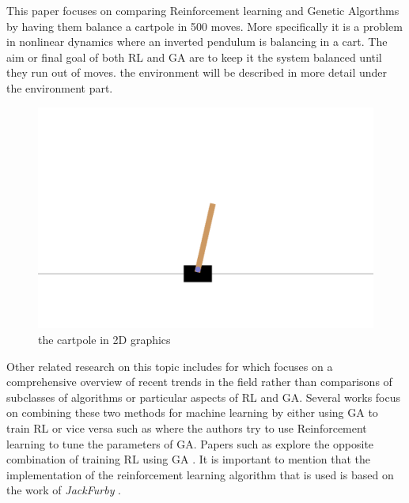 This paper focuses on comparing Reinforcement learning and Genetic Algorthms by having them balance a cartpole in 500 moves. More specifically it is a problem in nonlinear dynamics where an inverted pendulum is balancing in a cart. The aim or final goal of both RL and GA are to keep it the system balanced until they run out of moves. the environment will be described in more detail under the environment part.  
\begin{figure}[H]
    \centering
    \includegraphics [scale = 0.18]{Images/cartpole.png}
    \caption{the cartpole in 2D graphics}
    \label{figPOLE}
\end{figure}
Other related research on this topic includes for \cite{drugan2019reinforcement} which focuses on a comprehensive overview of recent trends in the field rather than comparisons of subclasses of algorithms or particular aspects of RL and GA. Several works focus on combining these two methods for machine learning by either using GA to train RL or vice versa such as \cite{eiben2007reinforcement} where the authors try to use Reinforcement learning to tune the parameters of GA.  Papers such as  \cite{khadka2018evolutionary} explore the opposite combination of training RL using GA . It is important to mention that the implementation of the reinforcement learning algorithm that is used is based on the work of \textit{JackFurby} \cite{JackFurbyCartPole}. 



